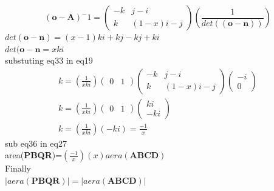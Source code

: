 \documentclass[journal,10pt,twocolumn]{article}
\begin{document}
\begin{equation}
     (\boldsymbol{o}-\boldsymbol{A})^-1=
     \begin{pmatrix}
         -k & j-i\\
         k  & (1-x)i-j
     \end{pmatrix}
     (\frac{1}{det((\boldsymbol{o}-\boldsymbol{n}))})
\end{equation}
$det(\boldsymbol{o}-\boldsymbol{n})=(x-1)ki+kj-kj+ki$\\
$det(\boldsymbol{o}-\boldsymbol{n}=xki$\\
substuting eq33 in eq19
\begin{eqnarray}
    k=(\frac{1}{xki})
    \begin{pmatrix}
        0 & 1
    \end{pmatrix}
    \begin{pmatrix}
        -k & j-i\\
        k & (1-x)i-j
    \end{pmatrix}
    \begin{pmatrix}
        -i\\
        0
    \end{pmatrix}\\
    k=(\frac{1}{xki})
    \begin{pmatrix}
        0 &1
    \end{pmatrix}
    \begin{pmatrix}
        ki\\
        -ki
    \end{pmatrix}\\
    k=(\frac{1}{xki})(-ki)=\frac{-1}{x}
\end{eqnarray}
sub eq36 in eq27\\
area(\textbf{PBQR})=$(\frac{-1}{x})(x)aera(\textbf{ABCD})$\\
Finally\\
      $|aera(\textbf{PBQR})|=|aera(\textbf{ABCD})|$
\end{document}
